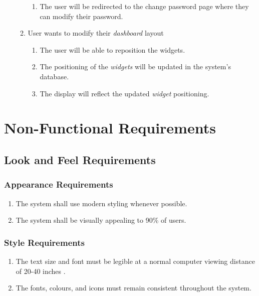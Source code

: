 \documentclass{article}
\begin{document}
\begin{enumerate}[{VP}1]
\begin{enumerate}[{BE}1]
\begin{enumerate}
				\item The user will be redirected to the change password page where they can modify their password.
			\end{enumerate}
			\item User wants to modify their \textit{dashboard} layout
			\begin{enumerate}
				\item The user will be able to reposition the widgets.
				\item The positioning of the \textit{widgets} will be updated in the system's database.
				\item The display will reflect the updated \textit{widget} positioning.
			\end{enumerate}
		\end{enumerate}
	\end{enumerate}
	
	
	\section{Non-Functional Requirements}
	\label{sec:non-functional_requirements}
	\subsection{Look and Feel Requirements}
	\label{sub:look_and_feel_requirements}
	
	\subsubsection{Appearance Requirements}
	\label{ssub:appearance_requirements}
	\begin{enumerate}[{LF}1. ]
		\item The system shall use modern styling whenever possible.
		\item The system shall be visually appealing to 90\% of users.
	\end{enumerate}
	
	\subsubsection{Style Requirements}
	\label{ssub:style_requirements}
	\begin{enumerate}[{LF}1. ]
		\item The text size and font must be legible at a normal computer viewing distance of 20-40 inches \cite{OSHA}.
		\item The fonts, colours, and icons must remain consistent throughout the system.
	\end{enumerate}
	
\end{document}
